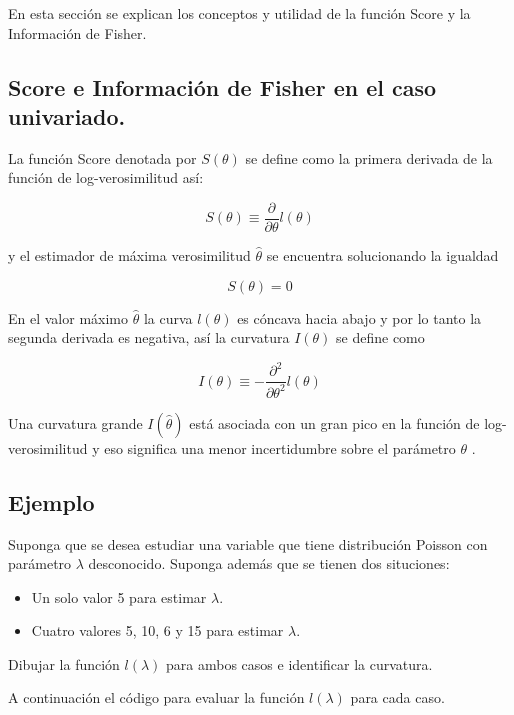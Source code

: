 \documentclass[10pt,]{krantz}
\providecommand{\tightlist}{%
  \setlength{\itemsep}{0pt}\setlength{\parskip}{0pt}}
\begin{document}
En esta sección se explican los conceptos y utilidad de la función Score
y la Información de Fisher.

\subsection{Score e Información de Fisher en el caso
univariado.}\label{score-e-informacion-de-fisher-en-el-caso-univariado.}

La función Score denotada por \(S(\theta)\) se define como la primera
derivada de la función de log-verosimilitud así:

\[
S(\theta) \equiv \frac{\partial}{\partial \theta} l(\theta)
\]

y el estimador de máxima verosimilitud \(\hat{\theta}\) se encuentra
solucionando la igualdad

\[
S(\theta) = 0
\]

En el valor máximo \(\hat{\theta}\) la curva \(l(\theta)\) es cóncava
hacia abajo y por lo tanto la segunda derivada es negativa, así la
curvatura \(I(\theta)\) se define como

\[
I(\theta) \equiv - \frac{\partial^2}{\partial \theta^2} l(\theta)
\]

Una curvatura grande \(I(\hat{\theta})\) está asociada con un gran pico
en la función de log-verosimilitud y eso significa una menor
incertidumbre sobre el parámetro \(\theta\) \citep{pawitan_2013}.

\subsection*{Ejemplo}\label{ejemplo-53}


Suponga que se desea estudiar una variable que tiene distribución
Poisson con parámetro \(\lambda\) desconocido. Suponga además que se
tienen dos situciones:

\begin{itemize}
\tightlist
\item
  Un solo valor 5 para estimar \(\lambda\).
\item
  Cuatro valores 5, 10, 6 y 15 para estimar \(\lambda\).
\end{itemize}

Dibujar la función \(l(\lambda)\) para ambos casos e identificar la
curvatura.

A continuación el código para evaluar la función \(l(\lambda)\) para
cada caso.
\end{document}
